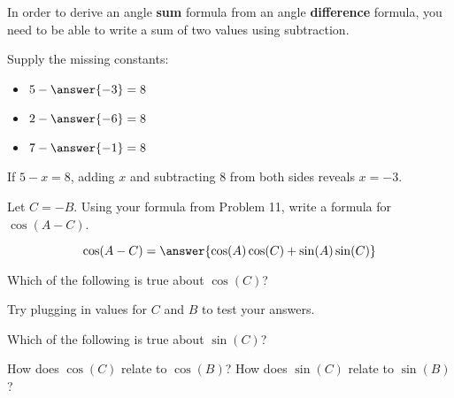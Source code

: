 \documentclass[number]{ximera}
\begin{document}
In order to derive an angle {\bf sum} formula from an angle {\bf difference} formula, you need to be able to write a sum of two values using subtraction.

\begin{problem}
Supply the missing constants:

\begin{itemize}
\item $5-\answer{-3}=8$
\item $2-\answer{-6}=8$
\item $7-\answer{-1}=8$
\end{itemize}
\begin{hint}
If $5-x=8$, adding $x$ and subtracting $8$ from both sides reveals $x=-3$.
\end{hint}

\end{problem}

\begin{problem}
Let $C=-B$. Using your formula from Problem 11, write a formula for $\cos(A-C)$.

\[\cos(A-C)=\answer{\cos(A)\cos(C)+\sin(A)\sin(C)}\]
\end{problem}

\begin{problem}
Which of the following is true about $\cos(C)$?
\begin{selectAll}
\end{selectAll}

\begin{hint}
Try plugging in values for $C$ and $B$ to test your answers.
\end{hint}

\end{problem}

\begin{problem}
Which of the following is true about $\sin(C)$?
\begin{selectAll}
\end{selectAll}
\end{problem}

\begin{question}
How does $\cos(C)$ relate to $\cos(B)$? How does $\sin(C)$ relate to $\sin(B)$?
\begin{freeResponse}
\end{freeResponse}
\end{question}
\end{document}
